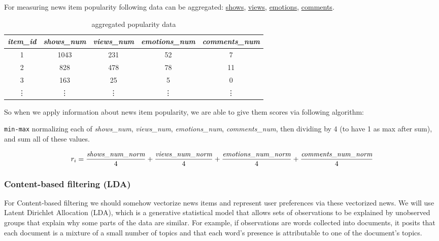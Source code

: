 \documentclass{article}
\begin{document}
For measuring news item popularity following data can be aggregated: \hyperref[tab:show]{shows}, \hyperref[tab:view]{views}, \hyperref[tab:emotion]{emotions}, \hyperref[tab:comment]{comments}.

\begin{table}[h]
    \centering
    \begin{tabular}{ccccc}
        \toprule

        \emph{item\_id} & \emph{shows\_num} & \emph{views\_num} & \emph{emotions\_num} & \emph{comments\_num} \\\midrule

        1 & 1043 & 231 & 52 & 7  \\
        2 & 828  & 478 & 78 & 11 \\
        3 & 163  & 25  & 5  & 0  \\
        \vdots & \vdots & \vdots & \vdots & \vdots \\\bottomrule


     \hline
    \end{tabular}

    \caption{aggregated popularity data}
    \label{tab:popularity}
\end{table}

So when we apply information about news item popularity, we are able to give them scores via following algorithm:

\texttt{min-max} normalizing each of \emph{shows\_num}, \emph{views\_num}, \emph{emotions\_num}, \emph{comments\_num}, then dividing by 4 (to have 1 as max after sum), and sum all of these values.

\begin{equation}
    r_i = \frac{\emph{shows\_num\_norm}}{4} + \frac{\emph{views\_num\_norm}}{4} + \frac{\emph{emotions\_num\_norm}}{4} + \frac{\emph{comments\_num\_norm}}{4} 
\end{equation}


\subsubsection{Content-based filtering (LDA)}

For Content-based filtering we should somehow vectorize news items and represent user preferences via these vectorized news. We will use Latent Dirichlet Allocation (LDA), which is a generative statistical model that allows sets of observations to be explained by unobserved groups that explain why some parts of the data are similar. For example, if observations are words collected into documents, it posits that each document is a mixture of a small number of topics and that each word's presence is attributable to one of the document's topics.
\end{document}
